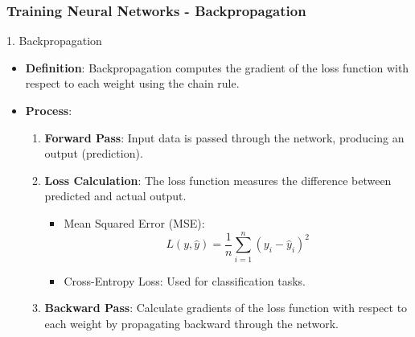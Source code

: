 \documentclass[aspectratio=169]{beamer}
\begin{document}
\begin{frame}[fragile]
    \frametitle{Training Neural Networks - Backpropagation}
    \begin{block}{1. Backpropagation}
        \begin{itemize}
            \item \textbf{Definition}: Backpropagation computes the gradient of the loss function with respect to each weight using the chain rule.
            \item \textbf{Process}:
            \begin{enumerate}
                \item \textbf{Forward Pass}: Input data is passed through the network, producing an output (prediction).
                \item \textbf{Loss Calculation}: The loss function measures the difference between predicted and actual output.
                \begin{itemize}
                    \item Mean Squared Error (MSE): 
                    \[
                    L(y, \hat{y}) = \frac{1}{n} \sum_{i=1}^{n} (y_i - \hat{y}_i)^2
                    \]
                    \item Cross-Entropy Loss: Used for classification tasks.
                \end{itemize}
                \item \textbf{Backward Pass}: Calculate gradients of the loss function with respect to each weight by propagating backward through the network.
            \end{enumerate}
        \end{itemize}
    \end{block}
\end{frame}
\end{document}
